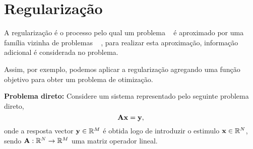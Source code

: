 

\section{Regularização}




A regularização é o processo pelo qual um problema \illposed~
é aproximado por uma família vizinha de problemas \wellposed~
\cite[pp. 49]{engl2000regularization},
para realizar esta aproximação, informação adicional é considerada no problema.


Assim, por exemplo, podemos aplicar a regularização agregando uma função objetivo para obter um problema de otimização.

\textbf{Problema direto:} Considere um sistema representado pelo seguinte problema direto,
\begin{equation}\label{eq:regularization:1}
\MATRIX{A}\VECTOR{x}=\VECTOR{y},
\end{equation}
onde a resposta vector $\VECTOR{y}\in \mathbb{R}^M$ é obtida logo de introduzir o estimulo $\VECTOR{x}\in \mathbb{R}^N$,
sendo $\MATRIX{A}:\mathbb{R}^N \rightarrow \mathbb{R}^M$ uma matriz operador lineal.

